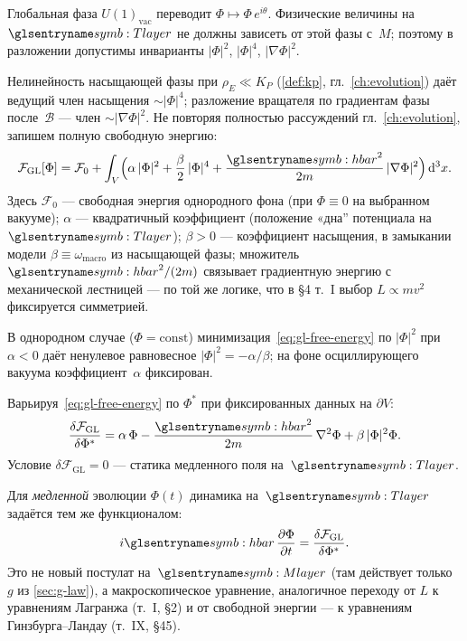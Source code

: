 Глобальная фаза $U(1)_{\mathrm{vac}}$ переводит $\Phi\mapsto\Phi\,e^{i\theta}$.
Физические величины на~$\Tlayer$ не должны зависеть от этой фазы с~$M$;
поэтому в разложении допустимы инварианты $|\Phi|^2$, $|\Phi|^4$, $|\nabla\Phi|^2$.

Нелинейность насыщающей фазы при $\rho_E\ll K_P$ (\cref{def:kp}, гл.~\ref{ch:evolution})
даёт ведущий член насыщения $\sim|\Phi|^4$; разложение вращателя по градиентам фазы
после~$\mathcal{B}$ --- член $\sim|\nabla\Phi|^2$.
Не повторяя полностью рассуждений гл.~\ref{ch:evolution}, запишем полную свободную энергию:
\begin{equation}
\label{eq:gl-free-energy}
  \mathcal{F}_{\mathrm{GL}}[\Phi]
  = \mathcal{F}_0
  + \int_V \Bigl(
      \alpha\,|\Phi|^2
      + \frac{\beta}{2}\,|\Phi|^4
      + \frac{\planckHbar^2}{2m}\,|\nabla\Phi|^2
    \Bigr)\,\mathrm{d}^3x.
\end{equation}
Здесь $\mathcal{F}_0$ --- свободная энергия однородного фона (при $\Phi\equiv 0$ на выбранном вакууме);
$\alpha$ --- квадратичный коэффициент (положение «дна'' потенциала на~$\Tlayer$);
$\beta>0$ --- коэффициент насыщения, в замыкании модели $\beta\equiv\omega_{\mathrm{macro}}$ из насыщающей фазы;
множитель $\planckHbar^2/(2m)$ связывает градиентную энергию с механической лестницей ---
по той же логике, что в \S4 т.~I выбор $L\propto mv^2$ фиксируется симметрией.

В однородном случае ($\Phi=\mathrm{const}$) минимизация~\eqref{eq:gl-free-energy} по $|\Phi|^2$
при $\alpha<0$ даёт ненулевое равновесное $|\Phi|^2=-\alpha/\beta$;
на фоне осциллирующего вакуума коэффициент~$\alpha$ фиксирован.

Варьируя~\eqref{eq:gl-free-energy} по $\Phi^*$ при фиксированных данных на $\partial V$:
\begin{equation}
\label{eq:gl-variation}
  \frac{\delta\mathcal{F}_{\mathrm{GL}}}{\delta\Phi^*}
  = \alpha\,\Phi
  - \frac{\planckHbar^2}{2m}\,\nabla^2\Phi
  + \beta\,|\Phi|^2\Phi.
\end{equation}
Условие $\delta\mathcal{F}_{\mathrm{GL}}=0$ --- статика медленного поля на~$\Tlayer$.

Для \emph{медленной} эволюции $\Phi(t)$ динамика на~$\Tlayer$ задаётся тем же функционалом:
\begin{equation}
\label{eq:gl-dynamics}
  i\planckHbar\,\frac{\partial\Phi}{\partial t}
  = \frac{\delta\mathcal{F}_{\mathrm{GL}}}{\delta\Phi^*}.
\end{equation}
Это не новый постулат на~$\Mlayer$ (там действует только~$g$ из \cref{sec:g-law}),
а макроскопическое уравнение, аналогичное переходу от $L$ к уравнениям Лагранжа
(т.~I, \S2) и от свободной энергии --- к уравнениям Гинзбурга--Ландау (т.~IX, \S45).

